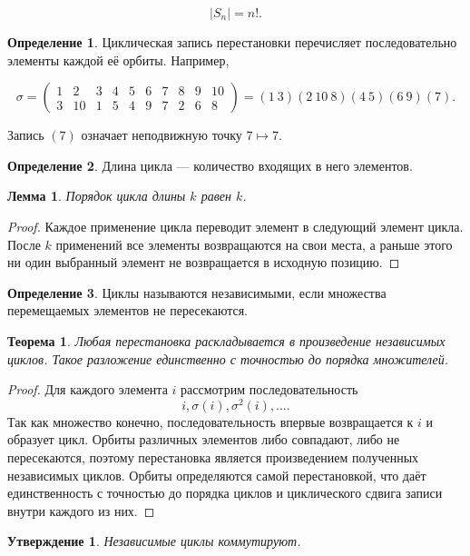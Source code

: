 \documentclass[12pt,a4paper,oneside,openany]{book}
\theoremstyle{definition}
\newtheorem{definition}{Определение}[chapter]
\theoremstyle{plain}
\newtheorem{theorem}{Теорема}[chapter]
\newtheorem{lemma}{Лемма}[chapter]
\newtheorem{proposition}{Утверждение}[chapter]
\theoremstyle{remark}
\begin{document}
\[
  |S_n|=n!.
\]

\begin{definition}
Циклическая запись перестановки перечисляет последовательно элементы
каждой её орбиты. Например,

\[
\sigma=
\begin{pmatrix}
1&2&3&4&5&6&7&8&9&10\\
3&10&1&5&4&9&7&2&6&8
\end{pmatrix}
=(1\ 3)(2\ 10\ 8)(4\ 5)(6\ 9)(7).
\]
\end{definition}

Запись $(7)$ означает неподвижную точку $7\mapsto7$.

\begin{definition}
Длина цикла --- количество входящих в него элементов.
\end{definition}

\begin{lemma}
Порядок цикла длины \(k\) равен \(k\).
\end{lemma}

\begin{proof}
Каждое применение цикла переводит элемент в следующий элемент цикла.
После $k$ применений все элементы возвращаются на свои места, а раньше
этого ни один выбранный элемент не возвращается в исходную позицию.
\end{proof}

\begin{definition}
Циклы называются независимыми, если множества
перемещаемых элементов не пересекаются.
\end{definition}

\begin{theorem}
Любая перестановка раскладывается в произведение независимых циклов.
Такое разложение единственно с точностью до порядка множителей.
\end{theorem}


\begin{proof}
Для каждого элемента $i$ рассмотрим последовательность
\[
  i,\sigma(i),\sigma^2(i),\ldots.
\]
Так как множество конечно, последовательность впервые возвращается к
$i$ и образует цикл. Орбиты различных элементов либо совпадают, либо не
пересекаются, поэтому перестановка является произведением полученных
независимых циклов. Орбиты определяются самой перестановкой, что даёт
единственность с точностью до порядка циклов и циклического сдвига
записи внутри каждого из них.
\end{proof}

\begin{proposition}
Независимые циклы коммутируют.
\end{proposition}
\end{document}
